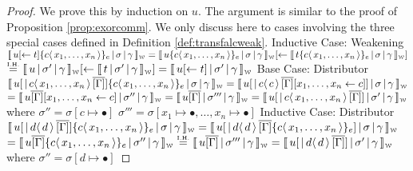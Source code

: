 \documentclass[a4paper,UKenglish,cleveref, autoref]{lipics-v2019}
\newcommand{\share}[3]{#1 [#2 \leftarrow #3]}
\newcommand{\dist}[5]{#1 [ #2 \, \vert \, \fakedist{#4}{#5} \, #3 ]}
\newcommand{\fakedist}[2]{#1 \langle \, #2 \, \rangle}
\newcommand{\exor}[3]{#1 \{ \fakedist{#2}{#3} \}_{e}}
\newcommand{\weaksymbol}{\mbox{\tiny $\mathcal{W}$}}
\newcommand{\readweakwmap}[3]{\llbracket \, #1 \, \vert \, #2 \, \vert \, #3  \, \rrbracket_{\weaksymbol} }
\newcommand{\IH}{\stackrel{\hbox{\tiny I.H.}}{\hbox{=}}}
\begin{document}
\begin{proof}
We prove this by induction on $u$. The argument is similar to the proof of Proposition \ref{prop:exorcomm}. We only discuss here to cases involving the three special cases defined in Definition \ref{def:transfalcweak}.
\newline
\newline
Inductive Case: Weakening
\newline
$\readweakwmap{\share{u}{}{t} \exor{}{c}{x_{1}, \dots, x_{n}}}{\sigma}{\gamma} = \share{\readweakwmap{u \exor{}{c}{x_{1}, \dots, x_{n}}}{\sigma}{\gamma}}{}{\readweakwmap{t \exor{}{c}{x_{1}, \dots, x_{n}}}{\sigma}{\gamma}}$
\newline
$\IH \share{\readweakwmap{u}{\sigma'}{\gamma}}{}{\readweakwmap{t}{\sigma'}{\gamma}} = \readweakwmap{\share{u}{}{t}}{\sigma'}{\gamma}$
\newline
\newline
Base Case: Distributor
\newline
$\readweakwmap{\dist{u}{}{\overline{[\Gamma]}}{c}{x_{1}, \dots, x_{n}} \exor{}{c}{x_{1}, \dots, x_{n}} }{\sigma}{\gamma} = \readweakwmap{\dist{u}{}{\overline{[\Gamma]} \share{}{x_{1}, \dots, x_{n}}{c}}{c}{c}  }{\sigma}{\gamma}$
\newline
$= \readweakwmap{u \overline{[\Gamma]}  \share{}{x_{1}, \dots, x_{n}}{c} }{\sigma''}{\gamma} = \readweakwmap{u \overline{[\Gamma]}}{\sigma'''}{\gamma} = \readweakwmap{\dist{u}{}{\overline{[\Gamma]}}{c}{x_{1}, \dots, x_{n}}}{\sigma'}{\gamma}$
\newline
where 
\newline
$\sigma'' = \sigma [c \mapsto \bullet]$
\newline
$\sigma''' = \sigma [x_{1} \mapsto \bullet, \dots, x_{n} \mapsto \bullet]$
\newline
\newline
Inductive Case: Distributor
\newline
$\readweakwmap{\dist{u}{}{\overline{[\Gamma]}}{d}{d} \exor{}{c}{x_{1}, \dots, x_{n}} }{\sigma}{\gamma} = \readweakwmap{\dist{u}{}{\overline{[\Gamma]}  \exor{}{c}{x_{1}, \dots, x_{n}} }{d}{d} }{\sigma}{\gamma}$
\newline
$= \readweakwmap{u \overline{[\Gamma]}  \exor{}{c}{x_{1}, \dots, x_{n}} }{\sigma''}{\gamma} \IH \readweakwmap{u \overline{[\Gamma]} }{\sigma'''}{\gamma} = \readweakwmap{\dist{u}{}{\overline{[\Gamma]}}{d}{d} }{\sigma'}{\gamma} $
\newline
where
\newline
$\sigma'' = \sigma [d \mapsto \bullet]$

\end{proof}
\end{document}
